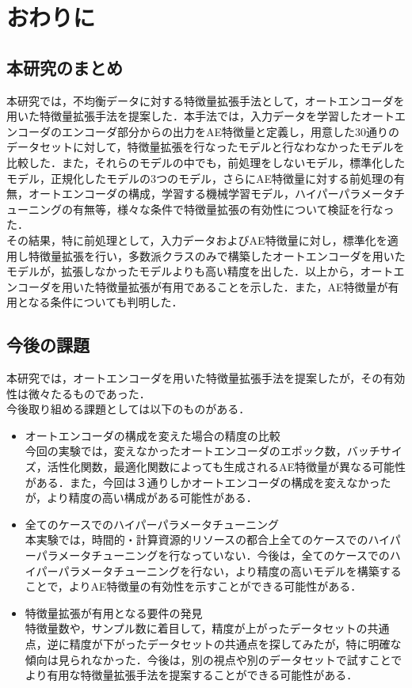 \chapter{おわりに}
\section{本研究のまとめ}
本研究では，不均衡データに対する特徴量拡張手法として，オートエンコーダを用いた特徴量拡張手法を提案した．本手法では，入力データを学習したオートエンコーダのエンコーダ部分からの出力をAE特徴量と定義し，用意した30通りのデータセットに対して，特徴量拡張を行なったモデルと行なわなかったモデルを比較した．また，それらのモデルの中でも，前処理をしないモデル，標準化したモデル，正規化したモデルの3つのモデル，さらにAE特徴量に対する前処理の有無，オートエンコーダの構成，学習する機械学習モデル，ハイパーパラメータチューニングの有無等，様々な条件で特徴量拡張の有効性について検証を行なった．\\
その結果，特に前処理として，入力データおよびAE特徴量に対し，標準化を適用し特徴量拡張を行い，多数派クラスのみで構築したオートエンコーダを用いたモデルが，拡張しなかったモデルよりも高い精度を出した．以上から，オートエンコーダを用いた特徴量拡張が有用であることを示した．また，AE特徴量が有用となる条件についても判明した．

\section{今後の課題}
本研究では，オートエンコーダを用いた特徴量拡張手法を提案したが，その有効性は微々たるものであった．\\
今後取り組める課題としては以下のものがある．
\begin{itemize}
    \item オートエンコーダの構成を変えた場合の精度の比較\\
    今回の実験では，変えなかったオートエンコーダのエポック数，バッチサイズ，活性化関数，最適化関数によっても生成されるAE特徴量が異なる可能性がある．また，今回は３通りしかオートエンコーダの構成を変えなかったが，より精度の高い構成がある可能性がある．
    \item 全てのケースでのハイパーパラメータチューニング\\
    本実験では，時間的・計算資源的リソースの都合上全てのケースでのハイパーパラメータチューニングを行なっていない．今後は，全てのケースでのハイパーパラメータチューニングを行ない，より精度の高いモデルを構築することで，よりAE特徴量の有効性を示すことができる可能性がある．
    \item 特徴量拡張が有用となる要件の発見\\
    特徴量数や，サンプル数に着目して，精度が上がったデータセットの共通点，逆に精度が下がったデータセットの共通点を探してみたが，特に明確な傾向は見られなかった．今後は，別の視点や別のデータセットで試すことでより有用な特徴量拡張手法を提案することができる可能性がある．

\end{itemize}